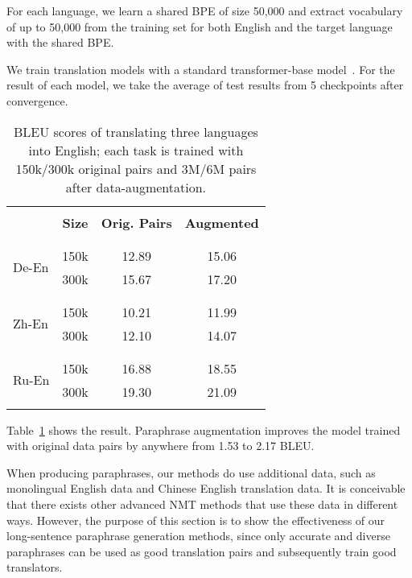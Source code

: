 For each language, we learn a shared BPE of size 50,000 
and extract vocabulary of up to 
50,000 from the training set for both English and the target language 
with the shared BPE. 

We train translation models with a standard 
transformer-base model~\cite{vaswani2017attention}. 
For the result of each model, we take the average of test results from 5 checkpoints after convergence.

\begin{table}
\centering
\small
\begin{tabular}{p{1cm}ccc}
\hline
\\ [-1.8ex]
& \textbf{Size} & \textbf{Orig. Pairs} & \textbf{Augmented} \\
\\ [-1.8ex]
\cline{2-4} 
\\ [-1.8ex]
\multirow{2}{1cm}{De-En} & 150k & 12.89 & 15.06 \\
& 300k & 15.67 & 17.20 \\
\\ [-1.8ex]
\hline
\\ [-1.8ex]
\multirow{2}{1cm}{Zh-En} & 150k & 10.21 & 11.99 \\
& 300k & 12.10 & 14.07 \\
\\ [-1.8ex]
\hline
\\ [-1.8ex]
\multirow{2}{1cm}{Ru-En} & 150k & 16.88 & 18.55 \\
& 300k & 19.30 & 21.09 \\
\\ [-1.8ex]
\hline
\end{tabular}
\caption{\label{tab:augment}
BLEU scores of translating three languages into English; 
each task is trained with 150k/300k original pairs 
and 3M/6M pairs after data-augmentation.}
\end{table}

Table~\ref{tab:augment} shows the result. 
Paraphrase augmentation improves the model trained with original data pairs 
by anywhere from 1.53 to 2.17 BLEU. 

When producing paraphrases, our methods do use additional data, 
such as monolingual English data and Chinese English translation data. 
It is conceivable that there exists other advanced NMT methods that use
these data in different ways. However, the purpose of this section is to 
show the effectiveness of our long-sentence paraphrase 
generation methods, since only accurate and diverse paraphrases 
can be used as good translation pairs and subsequently train good translators.
